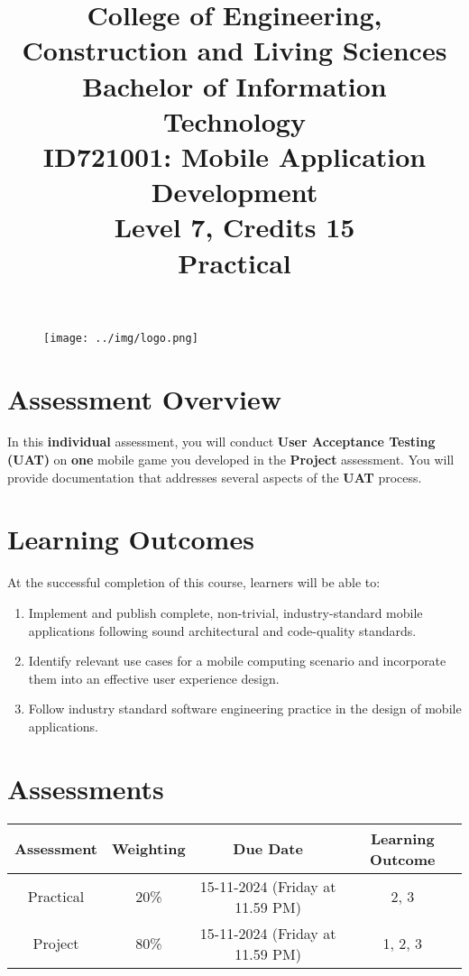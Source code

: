 \documentclass{article}
\author{}
\begin{document}
 

\begin{figure}
	\centering
	\texttt{[image: ../img/logo.png]}
\end{figure} 

\title{College of Engineering, Construction and Living Sciences\\Bachelor of Information Technology\\ID721001: Mobile Application Development\\Level 7, Credits 15\\\textbf{Practical}}
\date{}
\maketitle

\section*{Assessment Overview}
In this \textbf{individual} assessment, you will conduct \textbf{User Acceptance Testing (UAT)} on \textbf{one} mobile game you developed in the \textbf{Project} assessment. You will provide documentation that addresses several aspects of the \textbf{UAT} process. 

\section*{Learning Outcomes}
At the successful completion of this course, learners will be able to:
\begin{enumerate}
	\item Implement and publish complete, non-trivial, industry-standard mobile applications following sound architectural and code-quality standards.
	\item Identify relevant use cases for a mobile computing scenario and incorporate them into an effective user experience design.
	\item Follow industry standard software engineering practice in the design of mobile applications.
\end{enumerate}

\section*{Assessments}
\renewcommand{\arraystretch}{1.5}
\begin{tabular}{|c|c|c|c|}
	\hline
	\textbf{Assessment}                                 & \textbf{Weighting} & \textbf{Due Date}            & \textbf{Learning Outcome} \\ \hline
	\small Practical & \small 20\%        & \small 15-11-2024 (Friday at 11.59 PM)   & \small 2, 3                   \\ \hline
	\small Project                 & \small 80\%        & \small 15-11-2024 (Friday at 11.59 PM) \small  & \small 1, 2, 3                   \\ \hline
\end{tabular}
\end{document}

